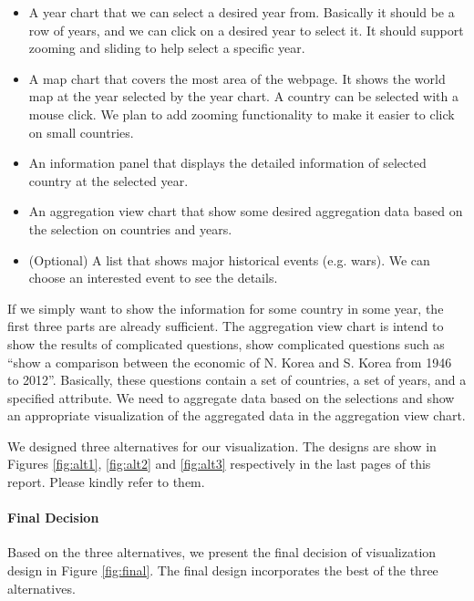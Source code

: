 \documentclass[12pt, fullpage,letterpaper]{article}
\begin{document}
\begin{itemize}
    \item A year chart that we can select a desired year from.
        Basically it should be a row of years, and we can click on a desired year to select it.
        It should support zooming and sliding to help select a specific year.
    \item A map chart that covers the most area of the webpage.
        It shows the world map at the year selected by the year chart.
        A country can be selected with a mouse click.
        We plan to add zooming functionality to make it easier to click on small countries.
    \item An information panel that displays the detailed information of selected country at the selected year.
    \item An aggregation view chart that show some desired aggregation data based on the selection on countries and years.
    \item (Optional) A list that shows major historical events (e.g. wars). We can choose an interested event to see the details.
\end{itemize}

If we simply want to show the information for some country in some year, the
first three parts are already sufficient. The aggregation view chart is intend
to show the results of complicated questions, show complicated questions such
as ``show a comparison between the economic of N. Korea and S. Korea from 1946
to 2012''.  Basically, these questions contain a set of countries, a set of
years, and a specified attribute.  We need to aggregate data based on the
selections and show an appropriate visualization of the aggregated data in the
aggregation view chart.

We designed three alternatives for our visualization.  The designs are show in
Figures \ref{fig:alt1}, \ref{fig:alt2} and \ref{fig:alt3} respectively in the
last pages of this report.  Please kindly refer to them.

\paragraph{Final Decision}

Based on the three alternatives, we present the final decision of visualization
design in Figure \ref{fig:final}. The final design incorporates the best
of the three alternatives.
\end{document}
